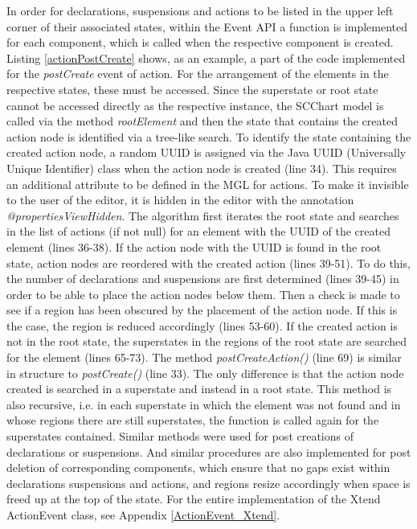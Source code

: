 In order for declarations, suspensions and actions to be listed in the upper left corner of their associated states, within the Event API a function is implemented for each component, which is called when the respective component is created. Listing \ref{actionPostCreate} shows, as an example, a part of the code implemented for the \textit{postCreate} event of action. For the arrangement of the elements in the respective states, these must be accessed. Since the superstate or root state cannot be accessed directly as the respective instance, the SCChart model is called via the method \textit{rootElement} and then the state that contains the created action node is identified via a tree-like search. To identify the state containing the created action node, a random UUID is assigned via the Java UUID (Universally Unique Identifier) class when the action node is created (line 34). This requires an additional attribute to be defined in the MGL for actions. To make it invisible to the user of the editor, it is hidden in the editor with the annotation \textit{@propertiesViewHidden}. The algorithm first iterates the root state and searches in the list of actions (if not null) for an element with the UUID of the created element (lines 36-38). If the action node with the UUID is found in the root state, action nodes are reordered with the created action (lines 39-51). To do this, the number of declarations and suspensions are first determined (lines 39-45) in order to be able to place the action nodes below them. Then a check is made to see if a region has been obscured by the placement of the action node. If this is the case, the region is reduced accordingly (lines 53-60). If the created action is not in the root state, the superstates in the regions of the root state are searched for the element (lines 65-73). The method \textit{postCreateAction()} (line 69) is similar in structure to \textit{postCreate()} (line 33). The only difference is that the action node created is searched in a superstate and instead in a root state. This method is also recursive, i.e. in each superstate in which the element was not found and in whose regions there are still superstates, the function is called again for the superstates contained. Similar methods were used for post creations of declarations or suspensions. And similar procedures are also implemented for post deletion of corresponding components, which ensure that no gaps exist within declarations suspensions and actions, and regions resize accordingly when space is freed up at the top of the state. For the entire implementation of the Xtend ActionEvent class, see Appendix \ref{ActionEvent_Xtend}.


